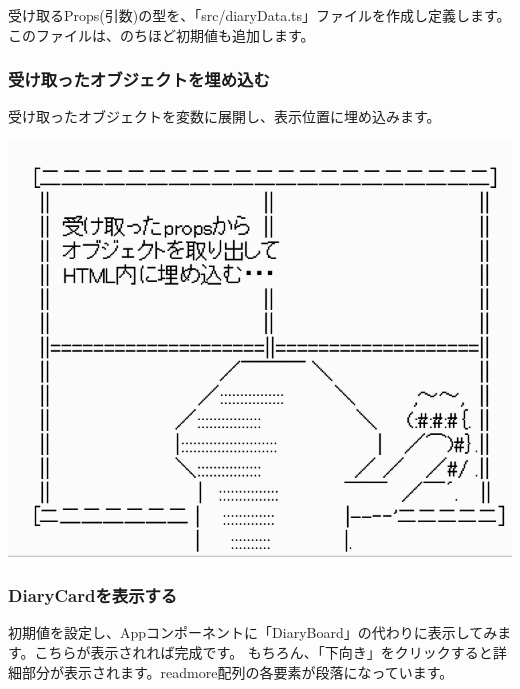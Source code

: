 受け取るProps(引数)の型を、「src/diaryData.ts」ファイルを作成し定義します。このファイルは、のちほど初期値も追加します。

\subsubsection*{受け取ったオブジェクトを埋め込む}
\keeplastskip{
  \label{sec:3-3-4-4}
  \label{sec-00332-5}
  \par\nobreak
}

受け取ったオブジェクトを変数に展開し、表示位置に埋め込みます。

\begin{reviewimage}[H]%
\includegraphics[width=0.5\maxwidth]{./images/03-todo-with-react/props.png}%
\label{image:03-todo-with-react:props}
\end{reviewimage}

\subsubsection*{DiaryCardを表示する}
\keeplastskip{
  \label{sec:3-3-4-5}
  \label{sec-00332-6}
  \par\nobreak
}

初期値を設定し、Appコンポーネントに「DiaryBoard」の代わりに表示してみます。こちらが表示されれば完成です。
もちろん、「下向き」をクリックすると詳細部分が表示されます。readmore配列の各要素が段落になっています。

